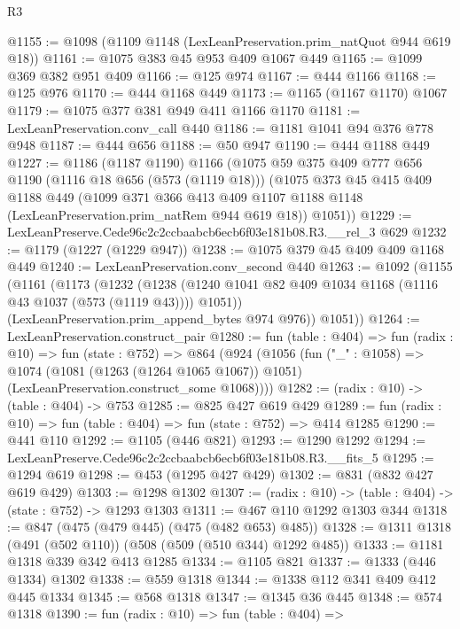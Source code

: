 \begin{lexlean}{R3}
\begin{coremodule}
@1155 := @1098 (@1109 @1148 (LexLeanPreservation.prim_natQuot @944 @619 @18))
@1161 := @1075 @383 @45 @953 @409 @1067 @449
@1165 := @1099 @369 @382 @951 @409
@1166 := @125 @974
@1167 := @444 @1166
@1168 := @125 @976
@1170 := @444 @1168 @449
@1173 := @1165 (@1167 @1170) @1067
@1179 := @1075 @377 @381 @949 @411 @1166 @1170
@1181 := LexLeanPreservation.conv_call @440
@1186 := @1181 @1041 @94 @376 @778 @948
@1187 := @444 @656
@1188 := @50 @947
@1190 := @444 @1188 @449
@1227 := @1186
    (@1187 @1190)
    @1166
    (@1075
      @59
      @375
      @409
      @777
      @656
      @1190
      (@1116 @18 @656 (@573 (@1119 @18)))
      (@1075
        @373
        @45
        @415
        @409
        @1188
        @449
        (@1099
          @371
          @366
          @413
          @409
          @1107
          @1188
          @1148
          (LexLeanPreservation.prim_natRem @944 @619 @18))
        @1051))
@1229 := LexLeanPreserve.Cede96c2c2ccbaabcb6ecb6f03e181b08.R3.__rel_3 @629
@1232 := @1179 (@1227 (@1229 @947))
@1238 := @1075 @379 @45 @409 @409 @1168 @449
@1240 := LexLeanPreservation.conv_second @440
@1263 := @1092
    (@1155
      (@1161
        (@1173
          (@1232
            (@1238 (@1240 @1041 @82 @409 @1034 @1168 (@1116 @43 @1037 (@573 (@1119 @43)))) @1051))
          (LexLeanPreservation.prim_append_bytes @974 @976))
        @1051))
@1264 := LexLeanPreservation.construct_pair
@1280 := fun (table : @404) =>
  fun (radix : @10) =>
  fun (state : @752) =>
  @864
    (@924
      (@1056
        (fun ("_" : @1058) =>
        @1074
          (@1081 (@1263 (@1264 @1065 @1067)) @1051)
          (LexLeanPreservation.construct_some @1068))))
@1282 := (radix : @10) -> (table : @404) -> @753
@1285 := @825 @427 @619 @429
@1289 := fun (radix : @10) => fun (table : @404) => fun (state : @752) => @414 @1285
@1290 := @441 @110
@1292 := @1105 (@446 @821)
@1293 := @1290 @1292
@1294 := LexLeanPreserve.Cede96c2c2ccbaabcb6ecb6f03e181b08.R3.__fits_5
@1295 := @1294 @619
@1298 := @453 (@1295 @427 @429)
@1302 := @831 (@832 @427 @619 @429)
@1303 := @1298 @1302
@1307 := (radix : @10) -> (table : @404) -> (state : @752) -> @1293 @1303
@1311 := @467 @110 @1292 @1303 @344
@1318 := @847 (@475 (@479 @445) (@475 (@482 @653) @485))
@1328 := @1311 @1318 (@491 (@502 @110)) (@508 (@509 (@510 @344) @1292 @485))
@1333 := @1181 @1318 @339 @342 @413 @1285
@1334 := @1105 @821
@1337 := @1333 (@446 @1334) @1302
@1338 := @559 @1318
@1344 := @1338 @112 @341 @409 @412 @445 @1334
@1345 := @568 @1318
@1347 := @1345 @36 @445
@1348 := @574 @1318
@1390 := fun (radix : @10) =>
  fun (table : @404) =>

\end{coremodule}
\end{lexlean}
